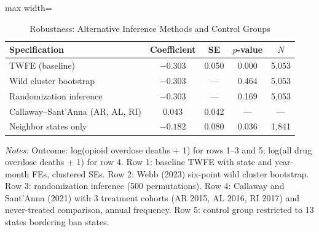 \begin{table}[!ht]
\centering
\caption{Robustness: Alternative Inference Methods and Control Groups}
\label{tab:robust}
\begin{threeparttable}
\begin{adjustbox}{max width=\textwidth}
\begin{tabular}{lcccc}
\toprule
Specification & Coefficient & SE & $p$-value & $N$ \\
\midrule
TWFE (baseline) & $-0.303$ & 0.050 & 0.000 & 5,053 \\
Wild cluster bootstrap & $-0.303$ & --- & 0.464 & 5,053 \\
Randomization inference & $-0.303$ & --- & 0.169 & 5,053 \\
Callaway--Sant'Anna (AR, AL, RI) & 0.043 & 0.042 & --- & --- \\
Neighbor states only & $-0.182$ & 0.080 & 0.036 & 1,841 \\
\bottomrule
\end{tabular}
\end{adjustbox}
\begin{tablenotes}[flushleft]\small
\item \textit{Notes:} Outcome: log(opioid overdose deaths $+$ 1) for rows 1--3 and 5; log(all drug overdose deaths $+$ 1) for row 4. Row 1: baseline TWFE with state and year-month FEs, clustered SEs. Row 2: Webb (2023) six-point wild cluster bootstrap. Row 3: randomization inference (500 permutations). Row 4: Callaway and Sant'Anna (2021) with 3 treatment cohorts (AR 2015, AL 2016, RI 2017) and never-treated comparison, annual frequency. Row 5: control group restricted to 13 states bordering ban states.
\end{tablenotes}
\end{threeparttable}
\end{table}
